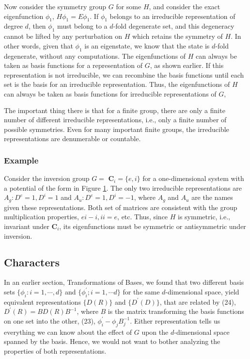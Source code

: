 Now consider the symmetry group $G$ for some $H$, and consider the 
exact eigenfunction $\phi_1$, $H \phi_1 = E \phi_1$.  If $\phi_1$ 
belongs to an irreducible representation of degree $d$, then $\phi_1$ 
must belong to a $d$-fold degenerate set, and this degeneracy cannot 
be lifted by any perturbation on $H$ which retains the symmetry of 
$H$.  In other words, given that $\phi_1$ is an eigenstate, we know 
that the state is $d$-fold degenerate, without any computations.  The 
eigenfunctions of $H$ can always be taken as basis functions for a 
representation of $G$, as shown earlier.  If this representation is not 
irreducible, we can recombine the basis functions until each set is 
the basis for an irreducible representation.  Thus, the 
eigenfunctions of $H$ can always be taken as basis functions for 
irreducible representations of $G$,

The important thing there is that for a finite group, there are only 
a finite number of different irreducible representations, i.e., only a 
finite number of possible symmetries.  Even for many important finite 
groups, the irreducible representations are denumerable or countable.

\subsubsection{Example}

\begin{figure}
\caption{}
\label{chap16-fig31}
\end{figure}

Consider the inversion group $G = $ {\bf C}$_i = \{e,i\}$ for a
one-dimensional system with a potential of the form in Figure
\ref{chap16-fig31}.  The only two irreducible representations are $A_g
: D^e = 1 , D^i = 1$ and $A_u : D^e = 1 , D^i = -1$, where $A_g$ and
$A_u$ are the names given these representations.  Both set of matrices
are consistent with the group multiplication properties, $ei - i , ii
= e$, etc.  Thus, since $H$ is symmetric, i.e., invariant under {\bf
C}$_i$, its eigenfunctions must be symmetric or antisymmetric under
inversion.

\subsection{Characters}

In an earlier section, Transformations of Bases, we found that two 
different basis sets $\{ \phi_i: i = 1 , \cdots , d\}$ and $\{ 
\phi^{\prime}_i ; i = 1 , \cdots d\}$ for the same $d$-dimensional 
space, yield equivalent representations $\{D(R)\}$ and 
$\{D^{\prime}(D)\}$, that are related by (24), $D^{\prime}(R) = 
BD(R)B^{-1}$, where $B$ is the matrix transforming the basis functions 
on one set into the other, (23), $\phi^{\prime}_i - \phi_j B_j^{-1}$.  
Either representation tells us everything we can know about the effect 
of $G$ upon the $d$-dimensional space spanned by the basis.  Hence, 
we would not want to bother analyzing the properties of both 
representations.

